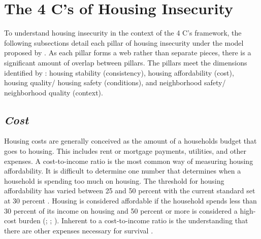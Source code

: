 \section{The 4 C's of Housing Insecurity}

To understand housing insecurity in the context of the 4 C's framework, the following subsections detail each pillar of housing insecurity under the model proposed by \citep{hernandez_housing_2019}. As each pillar forms a web rather than separate pieces, there is a significant amount of overlap between pillars. The pillars meet the dimensions identified by \citet{cox_road_2019}: housing stability (consistency), housing affordability (cost), housing quality/ housing safety (conditions), and neighborhood safety/ neighborhood quality (context). 
 
\subsection{\textit{Cost}}
Housing costs are generally conceived as the amount of a households budget that goes to housing. This includes rent or mortgage payments, utilities, and other expenses. A cost-to-income ratio is the most common way of measuring housing affordability. It is difficult to determine one number that determines when a household is spending too much on housing. The threshold for housing affordability has varied between 25 and 50 percent with the current standard set at 30 percent \citep{kropczynski_insights_2012}.  Housing is considered affordable if the household spends less than 30 percent of its income on housing and 50 percent or more is considered a high-cost burden (\citealp{braveman_housing_2011}; \citealp{swope_housing_2020}; \citealp{weicher_housing_2006}). Inherent to a cost-to-income ratio is the understanding that there are other expenses necessary for survival \citep{herbert_measuring_2018}. 
